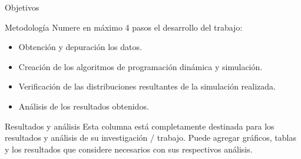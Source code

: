\documentclass[final]{beamer}
\newlength{\onecolwid}
\begin{document}
\begin{frame}[t]
\begin{columns}[t]
\begin{column}{\onecolwid}
\begin{block}{Objetivos}
\end{block}

\begin{block}{Metodología}
Numere en máximo 4 pasos el desarrollo del trabajo:
	\begin{itemize}
	\item Obtención y depuración los datos.
    \item Creación de los algoritmos de programación dinámica y simulación.
    \item Verificación de las distribuciones resultantes de la simulación realizada.
	\item Análisis de los resultados obtenidos.
	\end{itemize}
\end{block}


\begin{block}{Resultados y análisis}
Esta columna está completamente destinada para los resultados y análisis de su investigación / trabajo. Puede agregar gráficos, tablas y los resultados que considere necesarios con sus respectivos análisis.


\end{block}
\end{column}
\end{columns}
\end{frame}
\end{document}
